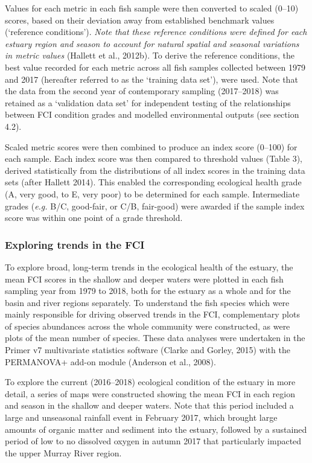 \documentclass[
]{book}
\begin{document}
Values for each metric in each fish sample were then converted to scaled (0--10) scores, based on their deviation away from established benchmark values (`reference conditions'). \emph{Note that these reference conditions were defined for each estuary region and season to account for natural spatial and seasonal variations in metric values} (Hallett et al., 2012b). To derive the reference conditions, the best value recorded for each metric across all fish samples collected between 1979 and 2017 (hereafter referred to as the `training data set'), were used. Note that the data from the second year of contemporary sampling (2017--2018) was retained as a `validation data set' for independent testing of the relationships between FCI condition grades and modelled environmental outputs (see section 4.2).~

Scaled metric scores were then combined to produce an index score (0--100) for each sample. Each index score was then compared to threshold values (Table 3), derived statistically from the distributions of all index scores in the training data sets (after Hallett 2014). This enabled the corresponding ecological health grade (A, very good, to E, very poor) to be determined for each sample. Intermediate grades (\emph{e.g.} B/C, good-fair, or C/B, fair-good) were awarded if the sample index score was within one point of a grade threshold.

\hypertarget{exploring-trends-in-the-fci}{%
\subsubsection{Exploring trends in the FCI}\label{exploring-trends-in-the-fci}}

To explore broad, long-term trends in the ecological health of the estuary, the mean FCI scores in the shallow and deeper waters were plotted in each fish sampling year from 1979 to 2018, both for the estuary as a whole and for the basin and river regions separately. To understand the fish species which were mainly responsible for driving observed trends in the FCI, complementary plots of species abundances across the whole community were constructed, as were plots of the mean number of species. These data analyses were undertaken in the Primer v7 multivariate statistics software (Clarke and Gorley, 2015) with the PERMANOVA+ add-on module (Anderson et al., 2008).

To explore the current (2016--2018) ecological condition of the estuary in more detail, a series of maps were constructed showing the mean FCI in each region and season in the shallow and deeper waters. Note that this period included a large and unseasonal rainfall event in February 2017, which brought large amounts of organic matter and sediment into the estuary, followed by a sustained period of low to no dissolved oxygen in autumn 2017 that particularly impacted the upper Murray River region.
\end{document}
